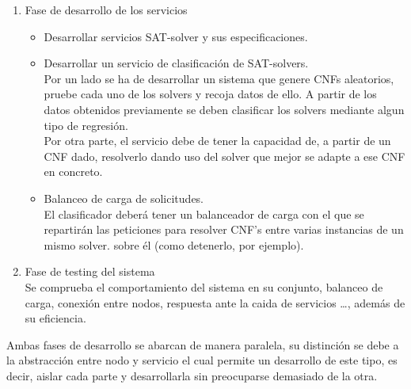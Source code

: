\documentclass[11pt]{article}
\begin{document}
\begin{enumerate}
\begin{itemize}
							Al especificarle un servicio, el servicio local del nodo le devolverá al cliente la dirección 
							de la instancia del servicio demandado y un token con el que efectuar acciones u obtener información 
							sobre él (como detenerlo, por ejemplo).
						\item Balanceo de carga de instancias. \\
							Al ser el nodo el que tiene la responsabilidad de construir y ejecutar los servicios demandados,
							este puede derivar a otros nodos de la red la tarea de construir y ejecutar un servicio. \\
							Se debe de desarrollar la lógica necesaria para que lo haga.
						\item Distribución de contenedores. \\
						\item Busqueda de otros nodos en la red.
					\end{itemize}
				\item Fase de desarrollo de los servicios
					\begin{itemize}
						\item Desarrollar servicios SAT-solver y sus especificaciones.
						\item Desarrollar un servicio de clasificación de SAT-solvers. \\
						Por un lado se ha de desarrollar un sistema que genere CNFs aleatorios,
						pruebe cada uno de los solvers y recoja datos de ello.
						A partir de los datos obtenidos previamente se deben clasificar los solvers mediante algun tipo de regresión.
						\\
						Por otra parte, el servicio debe de tener la capacidad de, a partir de un CNF dado, 
						resolverlo dando uso del solver que mejor se adapte a ese CNF en concreto.
						\item Balanceo de carga de solicitudes. \\
						El clasificador deberá tener un balanceador de carga
						con el que se repartirán las peticiones para resolver CNF's entre varias instancias de un mismo solver.
							sobre él (como detenerlo, por ejemplo).
					\end{itemize}
				\item Fase de testing del sistema \\
					Se comprueba el comportamiento del sistema en su conjunto, balanceo de carga, conexión entre nodos, respuesta ante la caida de servicios \dots, además de su eficiencia.
			\end{enumerate}
			Ambas fases de desarrollo se abarcan de manera paralela, su distinción se debe a la abstracción entre nodo y servicio el cual permite un desarrollo de este tipo, es decir, aislar cada 
			parte y desarrollarla sin preocuparse demasiado de la otra. \\ \\
			
\end{document}
